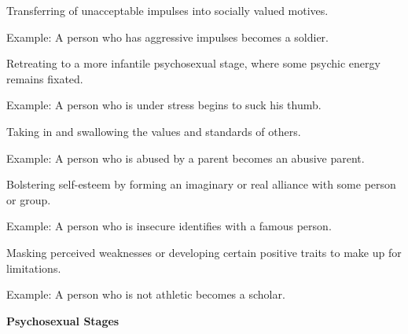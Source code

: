\begin{coloredlist}
\begin{coloredlist}
            \item {}
            \begin{coloredlist}
                \item Transferring of unacceptable impulses into socially valued motives.
                \item Example: A person who has aggressive impulses becomes a soldier.
            \end{coloredlist}
            \item {}
            \begin{coloredlist}
                \item Retreating to a more infantile psychosexual stage, where some psychic energy remains fixated.
                \item Example: A person who is under stress begins to suck his thumb.
            \end{coloredlist}
            \item {}
            \begin{coloredlist}
                \item Taking in and swallowing the values and standards of others.
                \item Example: A person who is abused by a parent becomes an abusive parent.
            \end{coloredlist}
            \item {}
            \begin{coloredlist}
                \item Bolstering self-esteem by forming an imaginary or real alliance with some person or group.
                \item Example: A person who is insecure identifies with a famous person.
            \end{coloredlist}
            \item {}
            \begin{coloredlist}
                \item Masking perceived weaknesses or developing certain positive traits to make up for limitations.
                \item Example: A person who is not athletic becomes a scholar.
            \end{coloredlist}
        \end{coloredlist}
        \item \textbf{Psychosexual Stages}

\end{coloredlist}
